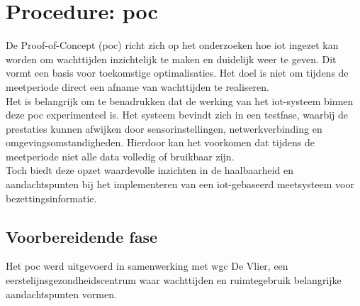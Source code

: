



\section{Procedure: \gls{poc}} \TODO %
De Proof-of-Concept (\gls{poc}) richt zich op het onderzoeken hoe \gls{iot} ingezet kan worden om wachttijden inzichtelijk te maken en duidelijk weer te geven. Dit vormt een basis voor toekomstige optimalisaties. Het doel is niet om tijdens de meetperiode direct een afname van wachttijden te realiseren. \\

Het is belangrijk om te benadrukken dat de werking van het \gls{iot}-systeem binnen deze \gls{poc} experimenteel is. Het systeem bevindt zich in een testfase, waarbij de prestaties kunnen afwijken door sensorinstellingen, netwerkverbinding en omgevingsomstandigheden. Hierdoor kan het voorkomen dat tijdens de meetperiode niet alle data volledig of bruikbaar zijn. \\

Toch biedt deze opzet waardevolle inzichten in de haalbaarheid en aandachtspunten bij het implementeren van een \gls{iot}-gebaseerd meetsysteem voor bezettingsinformatie.

\subsection{Voorbereidende fase}
Het \gls{poc} werd uitgevoerd in samenwerking met \gls{wgc} De Vlier, een eerstelijnsgezondheidscentrum waar wachttijden en ruimtegebruik belangrijke aandachtspunten vormen. \\

